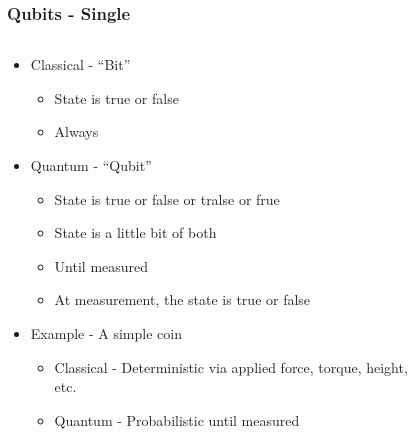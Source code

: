 \documentclass[aspectratio=169]{beamer}
\begin{document}
\begin{frame}
    \frametitle{Qubits - Single}
    \begin{columns}
        \begin{column}{0.5\textwidth}
            \begin{itemize}
                \item Classical - ``Bit''
                    \begin{itemize}
                        \item State is true or false
                        \item Always
                    \end{itemize}
                \item Quantum - ``Qubit''
                    \begin{itemize}
                        \item State is true or false or tralse or frue
                        \item State is a little bit of both
                        \item Until measured
                        \item At measurement, the state is true or false
                    \end{itemize}
                \item Example - A simple coin
                    \begin{itemize}
                        \item Classical - Deterministic via applied force, torque, height, etc.
                        \item Quantum - Probabilistic until measured
                    \end{itemize}
            \end{itemize}
        \end{column}
        \begin{column}{0.5\textwidth}
            \begin{figure}[h]

\end{figure}
\end{column}
\end{columns}
\end{frame}
\end{document}
